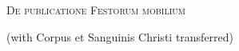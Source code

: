 \documentclass[14pt, a4paper]{memoir}
\begin{document}
\begin{center}\begin{huge}\textsc{De publicatione Festorum mobilium}\end{huge}

(with Corpus et Sanguinis Christi transferred)
\end{center}



\def\greinitialformat#1{%
{\fontsize{43}{43}\selectfont #1}%
}
\def\gretextformat#1{%
{\fontsize{16}{16}\selectfont #1}%
}

\redlines



{\footnotesize 
\noindent }
\end{document}
